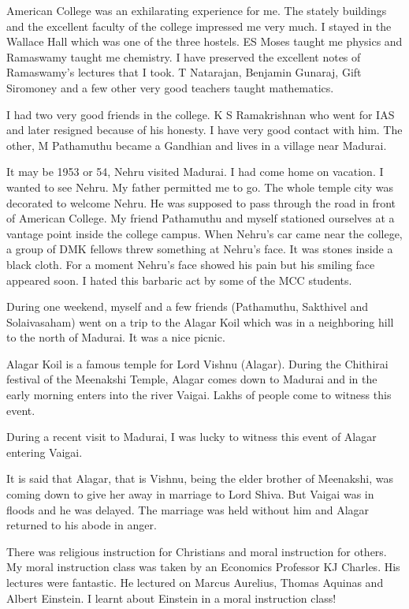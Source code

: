 American College was an exhilarating experience for me. The stately 
buildings and the excellent faculty of the college impre\-ssed me very 
much. I stayed in the Wallace Hall which was one of the three hostels. 
ES Moses taught me physics and Ramaswamy taught me chemistry. I have 
preserved the exce\-llent notes of Ramaswa\-my's lectures that I took. T 
Natarajan, Benjamin Guna\-raj, Gift Siromoney and a few other very good 
teachers taught mathematics.

I had two very good friends in the college. K S Ramakrishnan who went 
for IAS and later resigned because of his honesty. I have very good 
contact with him. The other, M Pathamuthu became a Gandhian and lives in 
a village near Madurai.

It may be 1953 or 54, Nehru visited Madurai. I had come home on 
vacation. I wanted to see Nehru. My father permitted\- me to go. The whole 
temple city was decorated to welcome Ne\-hru. He was supposed to pass 
through the road in front of Ameri\-can College. My friend Pathamuthu and 
myself stationed ourselves at a vantage point inside the college campus. 
When Neh\-ru's car came near the college, a group of DMK fellows threw 
something at Nehru's face. It was stones inside a black cloth. For a 
moment Nehru's face showed his pain but his smiling face appea\-red soon. 
I hated this barbaric act by some of the MCC studen\-ts.

During one weekend, myself and a few friends (Pathamuthu, Sakthivel and 
Solaivasaham) went on a trip to the Alagar Koil which was in a 
neighboring hill to the north of Madurai. It was a nice picnic.

Alagar Koil is a famous temple for Lord Vishnu (Alagar). Du\-ring the 
Chithirai festival of the Meenakshi Temple, Alagar co\-mes down to 
Madurai and in the early morning enters into the river Vaigai. Lakhs of 
people come to witness this event.

During a recent visit to Madurai, I was lucky to witness this event of 
Alagar entering Vaigai.

It is said that Alagar, that is Vishnu, being the elder brother of 
Meenakshi, was coming down to give her away in marriage to Lord Shiva. 
But Vaigai was in floods and he was delayed. The marriage was held 
without him and Alagar returned to his abode in anger.
 
There was religious instruction for Christians and moral instruction for 
others. My moral instruction class was taken by an Economics Professor 
KJ Charles. His lectures were fantastic. He lectured on Marcus Aurelius, 
Thomas Aquinas and Albert Einstein. I learnt about Einstein in a moral 
instruction class!

